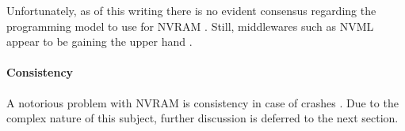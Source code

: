 Unfortunately, as of this writing there is no evident consensus regarding the
programming model to use for \ac{NVRAM} \cite{boehm2016persistence}. Still,
middlewares such as NVML appear to be gaining the upper hand
\cite{oukid2017data, volos2017whisper, malinowski2017using, andrei2017sap}.

\paragraph{Consistency}

A notorious problem with \ac{NVRAM} is consistency in case of crashes
\cite{condit2009better, dulloor2014system, oukid2017data}. Due to the complex
nature of this subject, further discussion is deferred to the next section.
